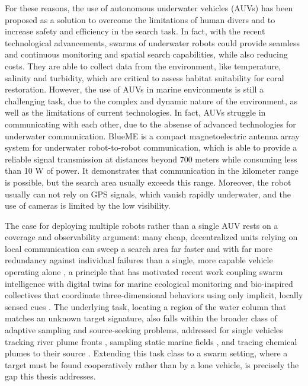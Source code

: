 For these reasons, the use of autonomous underwater vehicles (AUVs) has been proposed as a solution
to overcome the limitations of human divers and to increase safety and efficiency in the search task. 
In fact, with the recent technological advancements, swarms of underwater robots could provide
seamless and continuous monitoring and spatial search capabilities, while also reducing costs. 
They are able to collect data from the environment, like temperature, salinity and turbidity,
which are critical to assess habitat suitability for coral restoration. 
However, the use of AUVs in marine environments is still a challenging task, due to the complex and dynamic nature of the environment, as well as 
the limitations of current technologies. In fact, AUVs struggle in communicating with each other, due 
to the absense of advanced technologies for underwater communication. BlueME \cite{talebi2026blueme} is a compact magnetoelectric antenna array system
for underwater robot-to-robot communication, which is able to provide a reliable signal transmission
at distances beyond 700 meters while consuming less than 10 W of power. It demonstrates that communication 
in the kilometer range is possible, but the search area usually exceeds this range.
Moreover, the robot usually can not rely on GPS signals, which vanish rapidly underwater, and the use of 
cameras is limited by the low visibility.

The case for deploying multiple robots rather than a single AUV rests on a coverage and observability argument: many cheap, decentralized units relying on local communication can sweep a search area far faster and with far more redundancy against individual failures than a single, more capable vehicle operating alone \cite{duarte2016swarm}, a principle that has motivated recent work coupling swarm intelligence with digital twins for marine ecological monitoring \cite{couceiro2026paradigm} and bio-inspired collectives that coordinate three-dimensional behaviors using only implicit, locally sensed cues \cite{berlinger2021blueswarm}. The underlying task, locating a region of the water column that matches an unknown target signature, also falls within the broader class of adaptive sampling and source-seeking problems, addressed for single vehicles tracking river plume fronts \cite{berild2024adaptive}, sampling static marine fields \cite{stankiewicz2021adaptive}, and tracing chemical plumes to their source \cite{farrell2005cpt}. Extending this task class to a swarm setting, where a target must be found cooperatively rather than by a lone vehicle, is precisely the gap this thesis addresses.

